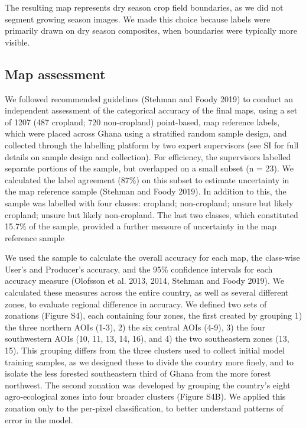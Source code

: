 \documentclass[11pt,a4paper]{article}
\begin{document}
The resulting map represents dry season crop field boundaries, as we did
not segment growing season images. We made this choice because labels
were primarily drawn on dry season composites, when boundaries were
typically more visible.

\hypertarget{map-assessment}{%
\subsection{Map assessment}\label{map-assessment}}

We followed recommended guidelines (Stehman and Foody 2019) to conduct
an independent assessment of the categorical accuracy of the final maps,
using a set of 1207 (487 cropland; 720 non-cropland) point-based, map
reference labels, which were placed across Ghana using a stratified
random sample design, and collected through the labelling platform by
two expert supervisors (see SI for full details on sample design and
collection). For efficiency, the supervisors labelled separate portions
of the sample, but overlapped on a small subset (n = 23). We calculated
the label agreement (87\%) on this subset to estimate uncertainty in the
map reference sample (Stehman and Foody 2019). In addition to this, the
sample was labelled with four classes: cropland; non-cropland; unsure
but likely cropland; unsure but likely non-cropland. The last two
classes, which constituted 15.7\% of the sample, provided a further
measure of uncertainty in the map reference sample

We used the sample to calculate the overall accuracy for each map, the
class-wise User's and Producer's accuracy, and the 95\% confidence
intervals for each accuracy measure (Olofsson et al. 2013, 2014, Stehman
and Foody 2019). We calculated these measures across the entire country,
as well as several different zones, to evaluate regional difference in
accuracy. We defined two sets of zonations (Figure S4), each containing
four zones, the first created by grouping 1) the three northern AOIs
(1-3), 2) the six central AOIs (4-9), 3) the four southwestern AOIs (10,
11, 13, 14, 16), and 4) the two southeastern zones (13, 15). This
grouping differs from the three clusters used to collect initial model
training samples, as we designed these to divide the country more
finely, and to isolate the less forested southeastern third of Ghana
from the more forest northwest. The second zonation was developed by
grouping the country's eight agro-ecological zones into four broader
clusters (Figure S4B). We applied this zonation only to the per-pixel
classification, to better understand patterns of error in the model.
\end{document}
